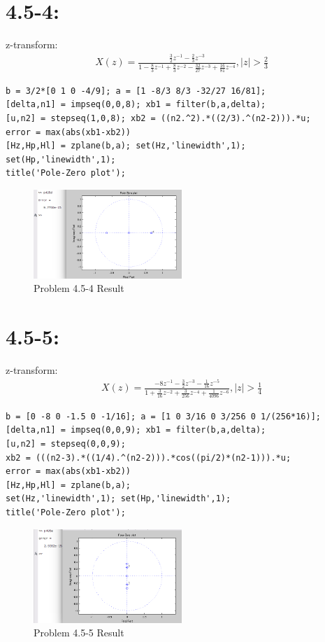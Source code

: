 \documentclass[11pt
  , a4paper
  , article
  , oneside
]{memoir}
\begin{document}
\section{4.5-4: }

z-transform:
\begin {equation}
\begin {split}
X(z)= \frac{\frac{3}{2}z^{-1}-\frac{2}{3}z^{-3}}{1-\frac{8}{3}z^{-1}+\frac{8}{3}z^{-2}-\frac{32}{27}z^{-3}+\frac{16}{81}z^{-4}}, |z| > \frac{2}{3}
\end{split}
\end {equation}

\begin{lstlisting}[style=termstyle]
b = 3/2*[0 1 0 -4/9]; a = [1 -8/3 8/3 -32/27 16/81];
[delta,n1] = impseq(0,0,8); xb1 = filter(b,a,delta);
[u,n2] = stepseq(1,0,8); xb2 = ((n2.^2).*((2/3).^(n2-2))).*u;
error = max(abs(xb1-xb2))
[Hz,Hp,Hl] = zplane(b,a); set(Hz,'linewidth',1); set(Hp,'linewidth',1);
title('Pole-Zero plot');
\end{lstlisting}

\begin{figure}[h!]
	\centering
	\includegraphics[width=0.5\textwidth,height=0.25\textwidth]{./images/p405-4.png}
	\caption{Problem 4.5-4 Result}
	\label{fig:Problem 4.5-4 Result}
\end{figure}

\clearpage

\section{4.5-5: }

z-transform:
\begin {equation}
\begin {split}
X(z)= \frac{-8z^{-1}-\frac{3}{2}z^{-3}-\frac{1}{16}z^{-5}}{1+\frac{3}{16}z^{-2}+\frac{3}{256}z^{-4}+\frac{1}{4096}z^{-6}}, |z| > \frac{1}{4} 
\end{split}
\end {equation}

\begin{lstlisting}[style=termstyle]
b = [0 -8 0 -1.5 0 -1/16]; a = [1 0 3/16 0 3/256 0 1/(256*16)];
[delta,n1] = impseq(0,0,9); xb1 = filter(b,a,delta);
[u,n2] = stepseq(0,0,9);
xb2 = (((n2-3).*((1/4).^(n2-2))).*cos((pi/2)*(n2-1))).*u;
error = max(abs(xb1-xb2))
[Hz,Hp,Hl] = zplane(b,a); 
set(Hz,'linewidth',1); set(Hp,'linewidth',1);
title('Pole-Zero plot');
\end{lstlisting}

\begin{figure}[h!]
	\centering
	\includegraphics[width=0.5\textwidth,height=0.25\textwidth]{./images/p405-5.png}
	\caption{Problem 4.5-5 Result}
	\label{fig:Problem 4.5-5 Result}
\end{figure}
\end{document}
